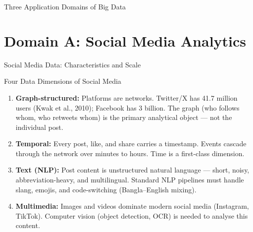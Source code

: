 \documentclass[aspectratio=169,10pt]{beamer}
\begin{document}
\begin{frame}{Three Application Domains of Big Data}
\begin{center}
  \end{center}
\end{frame}

\section{Domain A: Social Media Analytics}

\begin{frame}{Social Media Data: Characteristics and Scale}
  
      \begin{block}{Four Data Dimensions of Social Media}
        \begin{enumerate}
          \item \textbf{Graph-structured:}  Platforms are networks.  Twitter/X has 41.7 million users (Kwak et al., 2010); Facebook has 3 billion.  The graph (who follows whom, who retweets whom) is the primary analytical object --- not the individual post.
          \item \textbf{Temporal:}  Every post, like, and share carries a timestamp.  Events cascade through the network over minutes to hours.  Time is a first-class dimension.
          \item \textbf{Text (NLP):}  Post content is unstructured natural language --- short, noisy, abbreviation-heavy, and multilingual.  Standard NLP pipelines must handle slang, emojis, and code-switching (Bangla--English mixing).
          \item \textbf{Multimedia:}  Images and videos dominate modern social media (Instagram, TikTok).  Computer vision (object detection, OCR) is needed to analyse this content.
        \end{enumerate}
      \end{block}
 
\end{frame}
\end{document}
